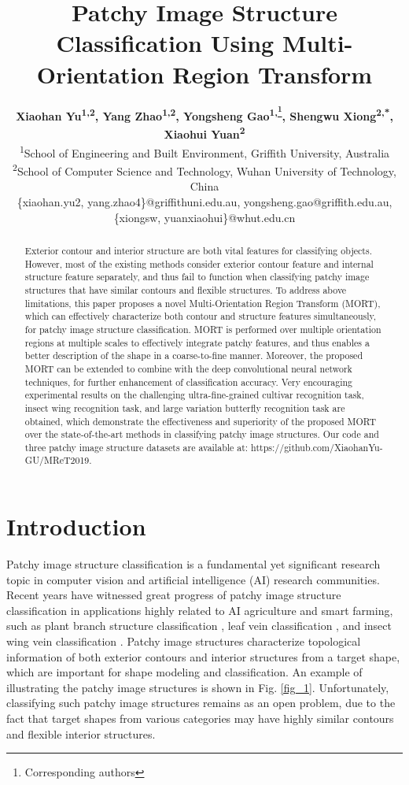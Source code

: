 \documentclass[letterpaper]{article} %
\title{Patchy Image Structure Classification Using Multi-Orientation Region Transform}
\author{\Large \textbf{Xiaohan Yu\textsuperscript{\rm 1,2}, Yang Zhao\textsuperscript{\rm 1,2}, Yongsheng Gao\textsuperscript{\rm 1,\thanks{Corresponding authors}}, Shengwu Xiong\textsuperscript{\rm 2,*}, Xiaohui Yuan\textsuperscript{\rm 2}}\\
\textsuperscript{\rm 1}School of Engineering and Built Environment, Griffith University, Australia\\ %
\textsuperscript{\rm 2}School of Computer Science and Technology, Wuhan University of Technology, China\\
\{xiaohan.yu2, yang.zhao4\}@griffithuni.edu.au, yongsheng.gao@griffith.edu.au,
\{xiongsw, yuanxiaohui\}@whut.edu.cn %
}
\begin{document}
\maketitle

\begin{abstract}
   Exterior contour and interior structure are both vital features for classifying objects. However, most of the existing methods consider exterior contour feature and internal structure feature separately, and thus fail to function when classifying patchy image structures that have similar contours and flexible structures. To address above limitations, this paper proposes a novel Multi-Orientation Region Transform (MORT), which can effectively characterize both contour and structure features simultaneously, for patchy image structure classification. MORT is performed over multiple orientation regions at multiple scales to effectively integrate patchy features, and thus enables a better description of the shape in a coarse-to-fine manner. Moreover, the proposed MORT can be extended to combine with the deep convolutional neural network techniques, for further enhancement of classification accuracy. Very encouraging experimental results on the challenging ultra-fine-grained cultivar recognition task, insect wing recognition task, and large variation butterfly recognition task are obtained, which demonstrate the effectiveness and superiority of the proposed MORT over the state-of-the-art methods in classifying patchy image structures. Our code and three patchy image structure datasets are available at: https://github.com/XiaohanYu-GU/MReT2019.
\end{abstract}


\section{Introduction}

Patchy image structure classification is a fundamental yet significant research topic in computer vision and artificial intelligence (AI) research communities. Recent years have witnessed great progress of patchy image structure classification in applications highly related to AI agriculture and smart farming, such as plant branch structure classification \cite{8}, leaf vein classification \cite{9}, and insect wing vein classification \cite{41}. Patchy image structures characterize topological information of both exterior contours and interior structures from a target shape, which are important for shape modeling and classification. An example of illustrating the patchy image structures is shown in Fig. \ref{fig_1}.  Unfortunately, classifying such patchy image structures remains as an open problem, due to the fact that target shapes from various categories may have highly similar contours and flexible interior structures.
\end{document}
